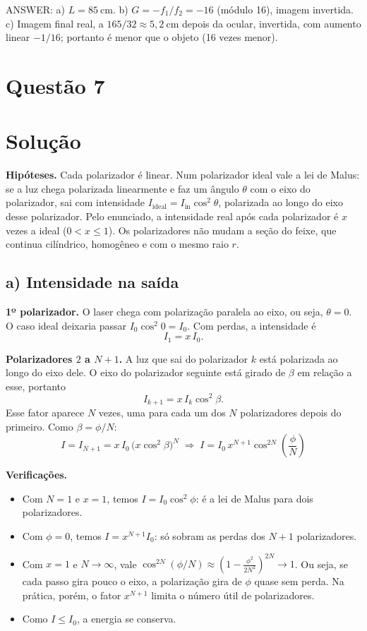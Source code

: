 \documentclass{article}%
\begin{document}
ANSWER: a) $L=85\ \text{cm}$. b) $G=-f_1/f_2=-16$ (módulo 16), imagem invertida. c) Imagem final real, a $165/32\approx 5{,}2\ \text{cm}$ depois da ocular, invertida, com aumento linear $-1/16$; portanto é menor que o objeto (16 vezes menor).%
\newpage%
\section*{Questão 7}

\section*{Solução}

\textbf{Hipóteses.} Cada polarizador é linear. Num polarizador ideal vale a lei de Malus: se a luz chega polarizada linearmente e faz um ângulo $\theta$ com o eixo do polarizador, sai com intensidade $I_{\text{ideal}} = I_{\text{in}}\cos^2\theta$, polarizada ao longo do eixo desse polarizador. Pelo enunciado, a intensidade real após cada polarizador é $x$ vezes a ideal ($0<x\le 1$). Os polarizadores não mudam a seção do feixe, que continua cilíndrico, homogêneo e com o mesmo raio $r$.

\subsection*{a) Intensidade na saída}

\textbf{1º polarizador.} O laser chega com polarização paralela ao eixo, ou seja, $\theta = 0$. O caso ideal deixaria passar $I_0\cos^2 0 = I_0$. Com perdas, a intensidade é
\[
I_1 = x\,I_0 .
\]

\textbf{Polarizadores $2$ a $N+1$.} A luz que sai do polarizador $k$ está polarizada ao longo do eixo dele. O eixo do polarizador seguinte está girado de $\beta$ em relação a esse, portanto
\[
I_{k+1} = x\,I_k\cos^2\beta .
\]
Esse fator aparece $N$ vezes, uma para cada um dos $N$ polarizadores depois do primeiro. Como $\beta = \phi/N$:
\[
I = I_{N+1} = x\,I_0\,\big(x\cos^2\beta\big)^{N}
\;\Longrightarrow\;
\boxed{I = I_0\,x^{N+1}\cos^{2N}\!\left(\frac{\phi}{N}\right)}
\]

\textbf{Verificações.}
\begin{itemize}
\item Com $N=1$ e $x=1$, temos $I = I_0\cos^2\phi$: é a lei de Malus para dois polarizadores.
\item Com $\phi = 0$, temos $I = x^{N+1}I_0$: só sobram as perdas dos $N+1$ polarizadores.
\item Com $x=1$ e $N\to\infty$, vale $\cos^{2N}(\phi/N)\approx \left(1-\frac{\phi^2}{2N^2}\right)^{2N}\to 1$. Ou seja, se cada passo gira pouco o eixo, a polarização gira de $\phi$ quase sem perda. Na prática, porém, o fator $x^{N+1}$ limita o número útil de polarizadores.
\item Como $I\le I_0$, a energia se conserva.
\end{itemize}
\end{document}

